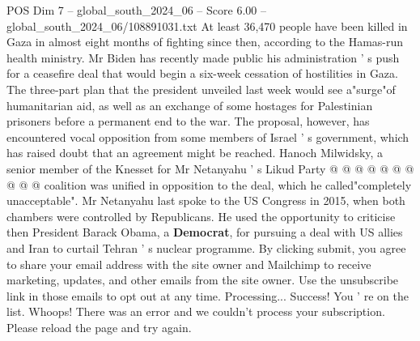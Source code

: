 \begin{textsample}{POS Dim 7 – global\_south\_2024\_06 – Score 6.00 – global\_south\_2024\_06/108891031.txt}
At least 36,470 people have been killed in Gaza in almost eight months of fighting since then, according to the Hamas-run health ministry.
Mr Biden has recently made public his administration ' s push for a ceasefire deal that would begin a six-week cessation of hostilities in Gaza.
The three-part plan that the president unveiled last week would see a"surge"of humanitarian aid, as well as an exchange of some hostages for Palestinian prisoners before a permanent end to the war.
The proposal, however, has encountered vocal opposition from some members of Israel ' s government, which has raised doubt that an agreement might be reached.
Hanoch Milwidsky, a senior member of the Knesset for Mr Netanyahu ' s Likud Party @ @ @ @ @ @ @ @ @ @ coalition was unified in opposition to the deal, which he called"completely unacceptable".
Mr Netanyahu last spoke to the US Congress in 2015, when both chambers were controlled by Republicans.
He used the opportunity to criticise then President Barack Obama, a \textbf{Democrat}, for pursuing a deal with US allies and Iran to curtail Tehran ' s nuclear programme.
By clicking submit, you agree to share your email address with the site owner and Mailchimp to receive marketing, updates, and other emails from the site owner.
Use the unsubscribe link in those emails to opt out at any time.
Processing...
Success!
You ' re on the list.
Whoops!
There was an error and we couldn't process your subscription.
Please reload the page and try again.

\end{textsample}
